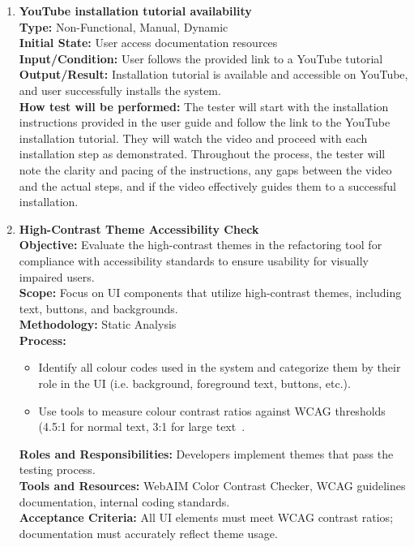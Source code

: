 \documentclass[12pt, titlepage]{article}
\begin{document}
\begin{enumerate}[label={\bf \textcolor{Maroon}{test-UH-\arabic*}},
    wide=0pt, font=\itshape]
  \item \textbf{YouTube installation tutorial availability} \\[2mm]
    \textbf{Type:} Non-Functional, Manual, Dynamic \\
    \textbf{Initial State:} User access documentation resources \\
    \textbf{Input/Condition:} User follows the provided link to a
    YouTube tutorial \\
    \textbf{Output/Result:} Installation tutorial is available and
    accessible on YouTube, and user successfully installs the system. \\[2mm]
    \textbf{How test will be performed:} The tester will start with
    the installation instructions provided in the user guide and
    follow the link to the YouTube installation tutorial. They will
    watch the video and proceed with each installation step as
    demonstrated. Throughout the process, the tester will note the
    clarity and pacing of the instructions, any gaps between the
    video and the actual steps, and if the video effectively guides
    them to a successful installation.

  \item \textbf{High-Contrast Theme Accessibility Check} \\[2mm]
    \textbf{Objective:} Evaluate the high-contrast themes in the
    refactoring tool for compliance with accessibility standards to
    ensure usability for visually impaired users. \\
    \textbf{Scope:} Focus on UI components that utilize high-contrast
    themes, including text, buttons, and backgrounds. \\
    \textbf{Methodology:} Static Analysis \\
    \textbf{Process:}
    \begin{itemize}
      \item Identify all colour codes used in the system and
        categorize them by their role in the UI (i.e. background,
        foreground text, buttons, etc.).
      \item Use tools to measure colour contrast ratios against WCAG
        thresholds (4.5:1 for normal text, 3:1 for large text~\cite{WCAG}.
      \end{itemize}
      \textbf{Roles and Responsibilities:} Developers implement
      themes that pass the testing process. \\[2mm]
      \textbf{Tools and Resources:} WebAIM Color Contrast Checker,
      WCAG guidelines documentation, internal coding standards. \\[2mm]
      \textbf{Acceptance Criteria:} All UI elements must meet WCAG
      contrast ratios; documentation must accurately reflect theme usage.


\end{enumerate}
\end{document}

